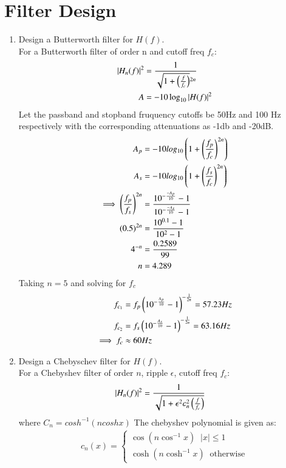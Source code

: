 \documentclass[journal,12pt,twocolumn]{IEEEtran}
\renewcommand\thesection{\arabic{section}}
\begin{document}
\section{Filter Design}
\begin{enumerate}[label=\thesection.\arabic*
,ref=\thesection.\theenumi]
\item Design a Butterworth filter for $H(f)$.\\
\solution For a Butterworth filter of order n and cutoff freq $f_c$:
\begin{align}
    |H_n(f)|^2&= \frac{1}{\sqrt{1+\left(\frac{f}{f_c}\right)}^{2n}}\\
    A&= -10\log_{10}|H(f)|^2
\end{align}
Let the passband and stopband fruquency cutoffs be 50Hz and 100 Hz respectively with the corresponding attenuations as -1db and -20dB.
\begin{align}
    A_p&= -10log_{10}\left(1+\left(\frac{f_p}{f_c}\right)^{2n}\right)\\    
    A_s&= -10log_{10}\left(1+\left(\frac{f_s}{f_c}\right)^{2n}\right)\\
    \implies \left(\frac{f_p}{f_s}\right)^{2n}&= \frac{10^{-\frac{-A_p}{10}}-1} {10^{-\frac{-A_s}{10}}-1}\\
    (0.5)^{2n}&= \frac{10^{0.1}-1}{10^{2}-1}\\
    4^{-n}&= \frac{0.2589}{99}\\
    n&= 4.289
\end{align}
Taking $n=5$ and solving for $f_c$
\begin{align}
    f_{c_1}&= f_p\left(10^{-\frac{A_p}{10}}-1\right)^{-\frac{1}{2n}}= 57.23Hz\\
    f_{c_2}&= f_s\left(10^{-\frac{A_s}{10}}-1\right)^{-\frac{1}{2n}}= 63.16Hz\\
    \implies f_c &\approx60Hz
\end{align}
\item Design a Chebyschev filter for $H(f)$.\\\solution
For a Chebyshev filter of order $n$, ripple $\epsilon$, cutoff freq $f_c$:
\begin{align}
    |H_n(f)|^2&= \frac{1}{\sqrt{1+\epsilon^2c_n^2\left(\frac{f}{f_c}\right)}}
\end{align}
where $C_n=cosh^{-1}(ncoshx)$
The chebyshev polynomial is given as:
\begin{align}
    c_n(x)=\begin{cases}
        \cos(n\cos^{-1} x) \;\; |x|\leq1\\
\cosh(n\cosh^{-1} x) \;\; \text{otherwise}
    \end{cases}

\end{align}
\end{enumerate}
\end{document}
